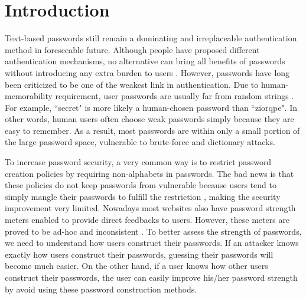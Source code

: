 
\section{Introduction}
Text-based passwords still remain a dominating and irreplaceable authentication method in foreseeable future. Although people have proposed different authentication mechanisms, no alternative can bring all benefits of passwords without introducing any extra burden to users \cite{bonneau2012quest}. However, passwords have long been criticized to be one of the weakest link in authentication. 
Due to human-memorability requirement, user passwords are usually far from random strings \cite{bonneau2012science,malone2012investigating,narayanan2005fast,veras2012visualizing,yan2004password}. For example, ``secret" is more likely a human-chosen password than ``ziorqpe". In other words, human
users often choose weak passwords simply because they are easy to remember. 
As a result, most passwords are within only a small portion of the large password space, vulnerable to brute-force and dictionary attacks. 

To increase password security, 
a very common way is to restrict password creation policies by requiring non-alphabets in passwords. The bad news is that these policies do not keep passwords from vulnerable because users tend to simply mangle their passwords to fulfill the restriction \cite{weir2010testing}, making the security improvement very limited. Nowadays most websites also have password strength meters enabled to provide direct feedbacks to users. However, these meters are proved to be ad-hoc and inconsistent \cite{de2014very}. To better assess the strength of passwords, we need to understand how users construct their passwords. If an attacker knows exactly how users construct their passwords, guessing their passwords will become much easier. On the other hand, if a user knows how other users construct their passwords, the user can easily improve his/her password strength by avoid using these password construction methods. 

